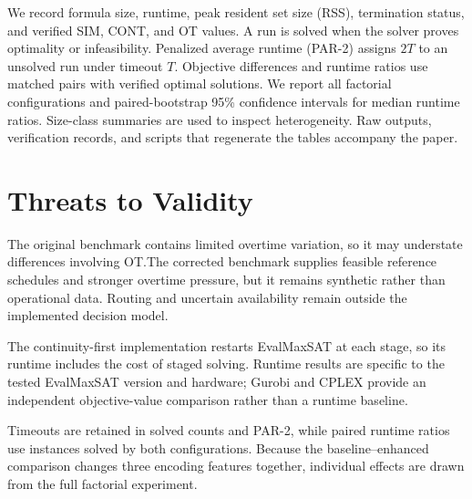 \documentclass[sigconf,nonacm]{acmart}
\newif\ifinternaloutline
\newif\iffrozenresults
\newcommand{\outlineblock}[1]{%
  \ifinternaloutline
    \par
    {\small\color{blue}\noindent\textbf{Outline note.} #1\par}
  \fi
}
\begin{document}
We record formula size, runtime, peak resident set size (RSS), termination
status, and verified SIM, CONT, and OT values.  A run is solved when
the solver proves optimality or infeasibility.  Penalized average runtime
(PAR-2) assigns $2T$ to an unsolved run under timeout $T$.  Objective differences
and runtime ratios use matched pairs with verified optimal solutions.  We report
all factorial configurations and paired-bootstrap 95\% confidence intervals for
median runtime ratios.  Size-class summaries are used to inspect heterogeneity.
Raw outputs, verification records, and scripts that
regenerate the tables accompany the paper.

\iffrozenresults
  
\else
  \ifinternaloutline
    
  \fi
\fi

\section{Threats to Validity}
\label{sec:threats}

The original benchmark contains limited overtime variation, so it may
understate differences involving OT.\@ The corrected benchmark supplies feasible
reference schedules and stronger overtime pressure, but it remains synthetic
rather than operational data.  Routing and uncertain availability remain
outside the implemented decision model.

The continuity-first implementation restarts EvalMaxSAT at each stage, so its
runtime includes the cost of staged solving.  Runtime results are specific to
the tested EvalMaxSAT version and hardware; Gurobi and CPLEX provide an
independent objective-value comparison rather than a runtime baseline.

Timeouts are retained in solved counts and PAR-2, while paired runtime ratios
use instances solved by both configurations.  Because the baseline--enhanced
comparison changes three encoding features together, individual effects are
drawn from the full factorial experiment.

\FloatBarrier
\iffrozenresults
  
\else
  \ifinternaloutline
    \section{Conclusion}
    \label{sec:conclusion}
    \outlineblock{Target 0.15--0.20 page.  Answer RQ1--RQ3 in result order using
    only frozen evidence.  Report mixed or conditional encoding effects as such.
    Close with incremental/native lexicographic solving and validation on
    operational data; routing and uncertainty remain model extensions.}
  \fi
\fi
\end{document}
